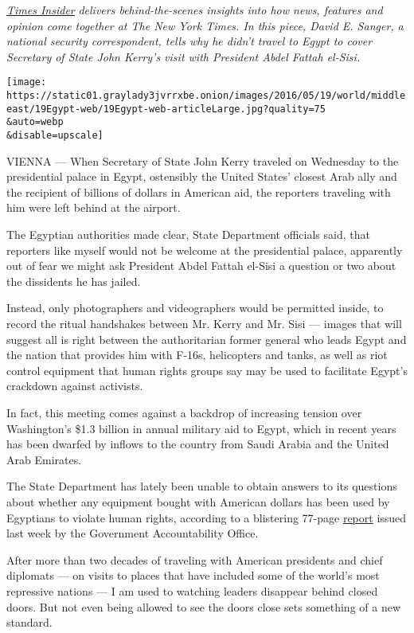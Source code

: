 \href{http://www.nytimes3xbfgragh.onion/section/insider}{\emph{Times
Insider}} \emph{delivers behind-the-scenes insights into how news,
features and opinion come together at The New York Times. In this piece,
David E. Sanger, a national security correspondent, tells why he didn't
travel to Egypt to cover Secretary of State John Kerry's visit with
President Abdel Fattah el-Sisi.}

\texttt{[image: https://static01.graylady3jvrrxbe.onion/images/2016/05/19/world/middleeast/19Egypt-web/19Egypt-web-articleLarge.jpg?quality=75\\\&auto=webp\\\&disable=upscale]}

VIENNA --- When Secretary of State John Kerry traveled on Wednesday to
the presidential palace in Egypt, ostensibly the United States' closest
Arab ally and the recipient of billions of dollars in American aid, the
reporters traveling with him were left behind at the airport.

The Egyptian authorities made clear, State Department officials said,
that reporters like myself would not be welcome at the presidential
palace, apparently out of fear we might ask President Abdel Fattah
el-Sisi a question or two about the dissidents he has jailed.

Instead, only photographers and videographers would be permitted inside,
to record the ritual handshakes between Mr. Kerry and Mr. Sisi ---
images that will suggest all is right between the authoritarian former
general who leads Egypt and the nation that provides him with F-16s,
helicopters and tanks, as well as riot control equipment that human
rights groups say may be used to facilitate Egypt's crackdown against
activists.

In fact, this meeting comes against a backdrop of increasing tension
over Washington's \$1.3 billion in annual military aid to Egypt, which
in recent years has been dwarfed by inflows to the country from Saudi
Arabia and the United Arab Emirates.

The State Department has lately been unable to obtain answers to its
questions about whether any equipment bought with American dollars has
been used by Egyptians to violate human rights, according to a
blistering 77-page \href{http://www.gao.gov/products/GAO-16-435}{report}
issued last week by the Government Accountability Office.

After more than two decades of traveling with American presidents and
chief diplomats --- on visits to places that have included some of the
world's most repressive nations --- I am used to watching leaders
disappear behind closed doors. But not even being allowed to see the
doors close sets something of a new standard.

